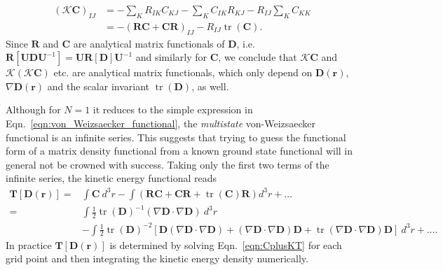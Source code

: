 \documentclass[journal=jacsat,manuscript=article]{achemso}
\DeclareMathOperator{\tr}{tr}
\newcommand\m[1]{\mathbf{#1}}
\renewcommand\vec[1]{\mathbf{#1}}
\begin{document}
\begin{equation}
\begin{split}
  (\mathcal{K} \vec{C})_{IJ} &= -\sum_{K} R_{IK} C_{KJ} - \sum_{K} C_{IK} R_{KJ} - R_{IJ} \sum_K C_{KK} \\
   &= - (\m{R} \m{C} + \m{C} \m{R})_{IJ} - R_{IJ} \tr(\m{C}).
\end{split}
\end{equation}
Since $\m{R}$ and $\m{C}$ are analytical matrix functionals of $\m{D}$, i.e. $\m{R}[\m{U} \m{D} \m{U}^{-1}] = \m{U} \m{R}[\m{D}] \m{U}^{-1}$ and similarly for $\m{C}$,
we conclude that $\mathcal{K} \vec{C}$ and $\mathcal{K} (\mathcal{K} \vec{C})$ etc. are analytical matrix functionals, which only depend on $\m{D}(\vec{r})$, $\nabla \m{D}(\vec{r})$ and the scalar invariant $\tr(\m{D})$, as well.

Although for $N=1$ it reduces to the simple expression in Eqn.~\ref{eqn:von_Weizsaecker_functional}, the \emph{multistate} von-Weizsaecker functional is an infinite series. 
This suggests that trying to guess the functional form of a matrix density functional from a known ground state functional will in general not be crowned with success.
Taking only the first two terms of the infinite series, the kinetic energy functional reads
\begin{equation}
\begin{split}
  \m{T}[\m{D}(\vec{r})] =& \int \m{C} ~ d^3\!r  - \int \left(\m{R} \m{C} + \m{C} \m{R} + \tr(\m{C}) \m{R} \right) d^3\!r  + \ldots \\
  =& \int \frac{1}{2} \tr(\m{D})^{-1} (\nabla \m{D} \cdot \nabla \m{D}) ~ d^3\!r \\
  & - \int \frac{1}{2} \tr(\m{D})^{-2} \left[ \m{D} (\nabla \m{D} \cdot \nabla \m{D}) + (\nabla \m{D} \cdot \nabla \m{D}) \m{D} + \tr(\nabla \m{D} \cdot \nabla \m{D}) \m{D} \right] ~ d^3\!r + \ldots .
\end{split}
\end{equation}
In practice $\m{T}[\m{D}(\vec{r})]$ is determined by solving Eqn.~\ref{eqn:CplusKT} for
each grid point and then integrating the kinetic energy density numerically.
\end{document}
